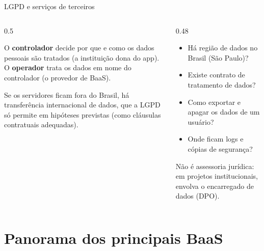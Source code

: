 \documentclass[aspectratio=169,10pt]{beamer}
\begin{document}
\begin{frame}{LGPD e serviços de terceiros}
  \begin{columns}[T]
    \begin{column}{0.5\textwidth}
      \begin{definicao}
        O \textbf{controlador} decide por que e como os dados pessoais são tratados (a instituição dona do app). O \textbf{operador} trata os dados em nome do controlador (o provedor de BaaS).
      \end{definicao}
      \begin{conceito}
        Se os servidores ficam fora do Brasil, há transferência internacional de dados, que a LGPD só permite em hipóteses previstas (como cláusulas contratuais adequadas).
      \end{conceito}
    \end{column}
    \begin{column}{0.48\textwidth}
      \begin{conceito}
        \begin{itemize}
          \item Há região de dados no Brasil (São Paulo)?
          \item Existe contrato de tratamento de dados?
          \item Como exportar e apagar os dados de um usuário?
          \item Onde ficam logs e cópias de segurança?
        \end{itemize}
      \end{conceito}
      \begin{atencao}
        Não é assessoria jurídica: em projetos institucionais, envolva o encarregado de dados (DPO).
      \end{atencao}
    \end{column}
  \end{columns}
\end{frame}

\section{Panorama dos principais BaaS}
\end{document}
